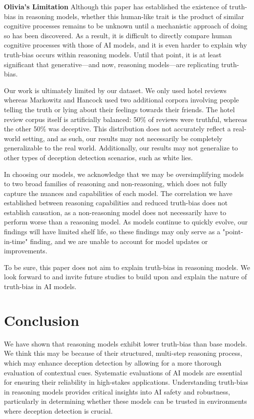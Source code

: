 \documentclass{article}
\begin{document}
\textbf{Olivia's Limitation}
Although this paper has established the existence of truth-bias in reasoning models, whether this human-like trait is the product of similar cognitive processes remains to be unknown until a mechanistic approach of doing so has been discovered. As a result, it is difficult to directly compare human cognitive processes with those of AI models, and it is even harder to explain why truth-bias occurs within reasoning models. Until that point, it is at least significant that generative---and now, reasoning models---are replicating truth-bias.

Our work is ultimately limited by our dataset. We only used hotel reviews whereas Markowitz and Hancock used two additional corpora involving people telling the truth or lying about their feelings towards their friends. The hotel review corpus itself is artificially balanced: 50\% of reviews were truthful, whereas the other 50\% was deceptive. This distribution does not accurately reflect a real-world setting, and as such, our results may not necessarily be completely generalizable to the real world. Additionally, our results may not generalize to other types of deception detection scenarios, such as white lies.

In choosing our models, we acknowledge that we may be oversimplifying models to two broad families of reasoning and non-reasoning, which does not fully capture the nuances and capabilities of each model. The correlation we have established between reasoning capabilities and reduced truth-bias does not establish causation, as a non-reasoning model does not necessarily have to perform worse than a reasoning model. As models continue to quickly evolve, our findings will have limited shelf life, so these findings may only serve as a "point-in-time" finding, and we are unable to account for model updates or improvements.

To be sure, this paper does not aim to explain truth-bias in reasoning models. We look forward to and invite future studies to build upon and explain the nature of truth-bias in AI models.

\section{Conclusion}
\label{sec:conclusion}

We have shown that reasoning models exhibit lower truth-bias than base models. We think this may be because of their structured, multi-step reasoning process, which may enhance deception detection by allowing for a more thorough evaluation of contextual cues. Systematic evaluations of AI models are essential for ensuring their reliability in high-stakes applications. Understanding truth-bias in reasoning models provides critical insights into AI safety and robustness, particularly in determining whether these models can be trusted in environments where deception detection is crucial.
\end{document}

